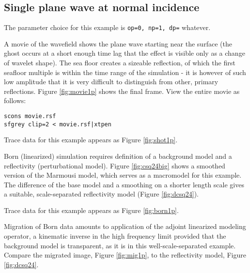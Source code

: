 \subsection{Single plane wave at normal incidence}
The parameter choice for this example is {\tt op=0, np=1, dp=} whatever. 

A movie of the wavefield shows the plane wave starting near the surface (the ghost occurs at a short enough time lag that the effect is visible only as a change of wavelet shape). The sea floor creates a sizeable reflection, of which the first seafloor multiple is within the time range of the simulation - it is however of such low amplitude that it is very difficult to distinguish from other, primary reflections. Figure \ref{fig:movie1p} 
shows the final frame. View the entire movie as follows: 
\begin{verbatim}
scons movie.rsf
sfgrey clip=2 < movie.rsf|xtpen
\end{verbatim}

Trace data for this example appears as Figure \ref{fig:shot1p}.


Born (linearized) simulation requires definition of a background model and a reflectivity (perturbational model). Figure \ref{fig:csq24big} shows a smoothed version of the Marmousi model, which serves as a macromodel for this example. The difference of the base model and a smoothing on a shorter length scale gives a suitable, scale-separated reflectivity model (Figure \ref{fig:dcsq24}).


Trace data for this example appears as Figure \ref{fig:born1p}.


Migration of Born data amounts to application of the adjoint linearized modeling operator, a kinematic inverse in the high frequency limit provided that the background model is transparent, as it is in this well-scale-separated example. Compare the migrated image, Figure \ref{fig:mig1p}, to the reflectivity model, Figure \ref{fig:dcsq24}.

